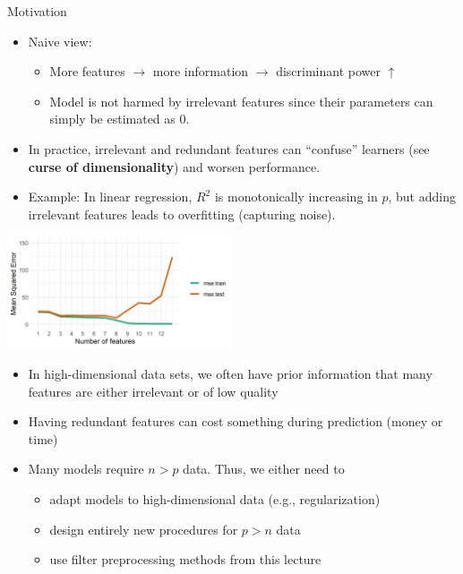 \documentclass[11pt,compress,t,notes=noshow, xcolor=table]{beamer}
\begin{document}
  \begin{vbframe}{Motivation}
    \begin{itemize}
    \setlength{\itemsep}{0.8em}
      \item Naive view:
        \begin{itemize}
          \item More features $\rightarrow$ more information $\rightarrow$ discriminant power $\uparrow$
          \item Model is not harmed by irrelevant features since their parameters can simply be estimated as 0.
        \end{itemize}
     \item In practice, irrelevant and redundant features can \enquote{confuse} learners (see \textbf{curse of dimensionality}) and worsen performance.
     \item Example: In linear regression, $R^2$ is monotonically increasing in $p$, but adding irrelevant features leads to overfitting (capturing noise). %
  \end{itemize}

  \begin{center}
     \includegraphics[width = 0.5\textwidth]{figure/avoid_overfitting_02.png}\\
    \end{center}

  \framebreak

    \begin{itemize}
    \setlength{\itemsep}{1.0em}
      \item In high-dimensional data sets, we often have prior information that many features are either irrelevant %
      or of low quality
      \item Having redundant features can cost something during prediction %
      (money or time)
      \item Many models require $n > p$ data. Thus, we either need to
      \begin{itemize}
        \item adapt models to high-dimensional data (e.g., regularization)
        \item design entirely new procedures for $p>n$ data
        \item use filter preprocessing methods from this lecture
      \end{itemize}
    \end{itemize}
  \end{vbframe}
\end{document}
